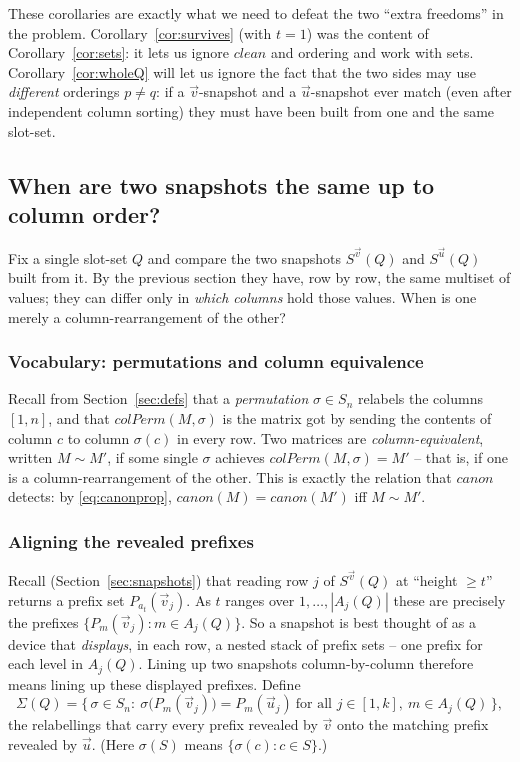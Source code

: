 These corollaries are exactly what we need to defeat the two ``extra freedoms'' in
the problem.  Corollary~\ref{cor:survives} (with $t=1$) was the content of
Corollary~\ref{cor:sets}: it lets us ignore $clean$ and ordering and work with
sets.  Corollary~\ref{cor:wholeQ} will let us ignore the fact that the two sides
may use \emph{different} orderings $p\ne q$: if a $\vec v$-snapshot and a
$\vec u$-snapshot ever match (even after independent column sorting) they must have
been built from one and the same slot-set.


\subsection{When are two snapshots the same up to column order?}
\label{sec:align}

Fix a single slot-set $Q$ and compare the two snapshots $S^{\vec v}(Q)$ and
$S^{\vec u}(Q)$ built from it.  By the previous section they have, row by row, the
same multiset of values; they can differ only in \emph{which columns} hold those
values.  When is one merely a column-rearrangement of the other?

\subsubsection*{Vocabulary: permutations and column equivalence}

\label{def:colequiv}Recall from Section~\ref{sec:defs} that a \emph{permutation} $\sigma\in S_n$ relabels the columns
$[1,n]$, and that $colPerm(M,\sigma)$ is the matrix got by sending the contents of
column $c$ to column $\sigma(c)$ in every row.  Two matrices are
\emph{column-equivalent}, written $M\sim M'$, if some single $\sigma$ achieves
$colPerm(M,\sigma)=M'$ -- that is, if one is a column-rearrangement of the other.
This is exactly the relation that $canon$ detects: by \eqref{eq:canonprop},
$canon(M)=canon(M')$ iff $M\sim M'$.

\subsubsection*{Aligning the revealed prefixes}

Recall (Section~\ref{sec:snapshots}) that reading row $j$ of $S^{\vec v}(Q)$ at
``height $\ge t$'' returns a prefix set $P_{a_t}(\vec v_j)$.  As $t$ ranges over
$1,\ldots,|A_j(Q)|$ these are precisely the prefixes
$\{P_m(\vec v_j):m\in A_j(Q)\}$.  So a snapshot is best thought of as a device that
\emph{displays}, in each row, a nested stack of prefix sets -- one prefix for each
level in $A_j(Q)$.  Lining up two snapshots column-by-column therefore means lining
up these displayed prefixes.  Define\label{def:sigma}
\[
\Sigma(Q)=\bigl\{\,\sigma\in S_n:\ \sigma\bigl(P_m(\vec v_j)\bigr)=P_m(\vec u_j)
\ \text{for all }j\in[1,k],\ m\in A_j(Q)\,\bigr\},
\]
the relabellings that carry every prefix revealed by $\vec v$ onto the matching
prefix revealed by $\vec u$.  (Here $\sigma(S)$ means $\{\sigma(c):c\in S\}$.)

